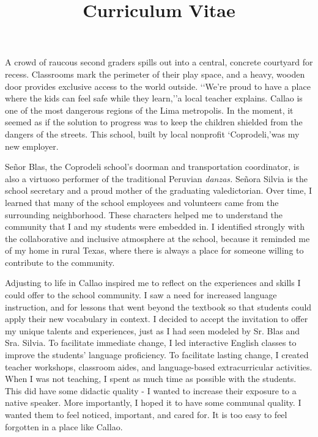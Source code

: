 \documentclass[12pt,a4paper,roman]{moderncv} %
\title{Curriculum Vitae}
\begin{document}


\clearpage


A crowd of raucous second graders spills out into a central, concrete courtyard for recess. Classrooms mark the perimeter of their play space, and a heavy, wooden door provides exclusive access to the world outside. \lq\lq We're proud to have a place where the kids can feel safe while they learn,\rq\rq\space a local teacher explains. Callao is one of the most dangerous regions of the Lima metropolis. In the moment, it seemed as if the solution to progress was to keep the children shielded from the dangers of the streets. This school, built by local nonprofit  \lq Coprodeli,\rq\space was my new employer.

\medskip
 
 Se\~nor Blas, the Coprodeli school's doorman and transportation coordinator, is also a virtuoso performer of the traditional Peruvian \textit{danzas.} Se\~nora Silvia is the school secretary and a proud mother of the graduating valedictorian.  Over time, I learned that many of the school employees and volunteers came from the surrounding neighborhood. These characters helped me to understand the community that I and my students were embedded in. I identified strongly with the collaborative and inclusive atmosphere at the school, because it reminded me of my home in rural Texas, where there is always a place for someone willing to contribute to the community.

\medskip

Adjusting to life in Callao inspired me to reflect on the experiences and skills I could offer to the school community. I saw a need for increased language instruction, and for lessons that went beyond the textbook so that students could apply their new vocabulary in context. I decided to accept the invitation to offer my unique talents and experiences, just as I had seen modeled by Sr. Blas and Sra. Silvia. To facilitate immediate change, I led interactive English classes to improve the students' language proficiency. To facilitate lasting change, I created teacher workshops, classroom aides, and language-based extracurricular activities.  When I was not teaching, I spent as much time as possible with the students. This did have some didactic quality - I wanted to increase their exposure to a native speaker. More importantly, I hoped it to have some communal quality. I wanted them to feel noticed, important, and cared for. It is too easy to feel forgotten in a place like Callao.
\end{document}
